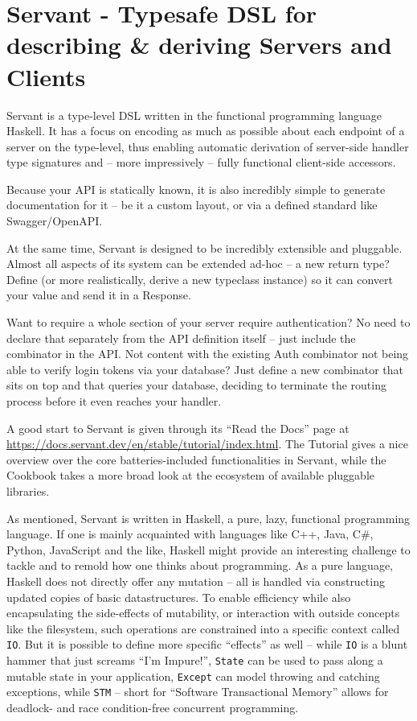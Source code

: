 \documentclass[11pt,utf8,english,a4paper]{article}
\begin{document}
\section*{Servant - Typesafe DSL for describing \& deriving Servers and Clients}

Servant is a type-level DSL written in the functional programming language Haskell.
It has a focus on encoding as much as possible about each endpoint of a server
on the type-level, thus enabling automatic derivation of server-side handler type signatures
and -- more impressively -- fully functional client-side accessors.

Because your API is statically known, it is also incredibly simple to generate documentation
for it -- be it a custom layout, or via a defined standard like Swagger/OpenAPI.

At the same time, Servant is designed to be incredibly extensible and pluggable.
Almost all aspects of its system can be extended ad-hoc -- a new return type? Define (or
more realistically, derive a new typeclass instance) so it can convert your value
and send it in a Response.

Want to require a whole section of your server require authentication? No need to declare
that separately from the API definition itself -- just include the combinator in the API.
Not content with the existing Auth combinator not being able to verify login tokens via
your database? Just define a new combinator that sits on top and that queries your database,
deciding to terminate the routing process before it even reaches your handler.

A good start to Servant is given through its \enquote{Read the Docs} page at \url{https://docs.servant.dev/en/stable/tutorial/index.html}.
The Tutorial gives a nice overview over the core batteries-included functionalities in
Servant, while the Cookbook takes a more broad look at the ecosystem of available pluggable
libraries.

As mentioned, Servant is written in Haskell, a pure, lazy, functional programming language.
If one is mainly acquainted with languages like C++, Java, C\#, Python, JavaScript and the like,
Haskell might provide an interesting challenge to tackle and to remold how one thinks about
programming.  As a pure language, Haskell does not directly offer any mutation -- all is handled
via constructing updated copies of basic datastructures.
To enable efficiency while also encapsulating the side-effects of mutability, or interaction
with outside concepts like the filesystem, such operations are constrained into a specific
context called \texttt{IO}.
But it is possible to define more specific \enquote{effects} as well -- while \texttt{IO}
is a blunt hammer that just screams \enquote{I'm Impure!}, \texttt{State} can be used to
pass along a mutable state in your application, \texttt{Except} can model throwing and catching
exceptions, while \texttt{STM} -- short for \enquote{Software Transactional Memory} allows for
deadlock- and race condition-free concurrent programming.
\end{document}
